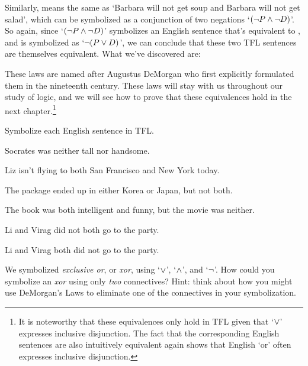 Similarly,  means the same as `Barbara will not get soup and Barbara will not get salad', which can be symbolized as a conjunction of two negations `$(\neg P \wedge \neg D)$'.  So again, since `$(\neg P \wedge \neg D)$' symbolizes an English sentence that's equivalent to , and  is symbolized as `$\neg (P \vee D)$', we can conclude that these two TFL sentences are themselves equivalent.  What we've discovered are:


\noindent These  laws are named after Augustus DeMorgan who first explicitly formulated them in the nineteenth century.  These laws will stay with us throughout our study of logic, and we will see how to prove that these equivalences hold in the next chapter.\footnote{It is noteworthy that these equivalences only hold in TFL given that `$\vee$' expresses inclusive disjunction.  The fact that the corresponding English sentences are also intuitively equivalent again shows that English `or' often expresses inclusive disjunction.}

\practiceproblems
\problempart Symbolize each English sentence in TFL.

\begin{earg}
\item Socrates was neither tall nor handsome.
\item Liz isn't flying to both San Francisco and New York today.
\item The package ended up in either Korea or Japan, but not both.
\item The book was both intelligent and funny, but the movie was neither.
\item Li and Virag did not both go to the party.
\item Li and Virag both did not go to the party.
\end{earg}

\problempart
We symbolized \emph{exclusive or}, or \emph{xor}, using `$\vee$', `$\wedge$', and `$\neg$'. How could you symbolize an \emph{xor} using only \emph{two} connectives? Hint: think about how you might use DeMorgan's Laws to eliminate one of the connectives in your symbolization.

